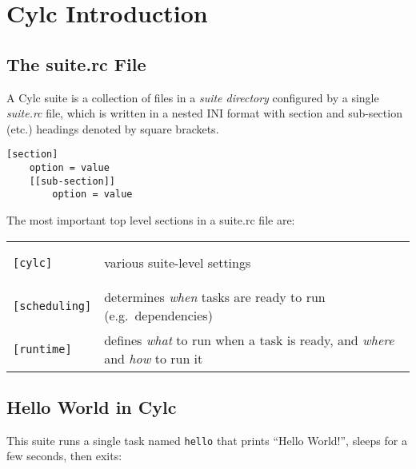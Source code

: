 \section{Cylc Introduction}
\label{Cylc Introduction}


\subsection{The suite.rc File}

A Cylc suite is a collection of files in a {\em suite directory} configured by
a single {\em suite.rc} file, which is written in a nested INI format with
section and sub-section (etc.) headings denoted by square brackets.

\begin{lstlisting}[language=suiterc]
[section]
    option = value
    [[sub-section]]
        option = value
\end{lstlisting}

The most important top level sections in a suite.rc file are:

\begin{tabular}{ll}
\begin{lstlisting}
[cylc]
\end{lstlisting} & various suite-level settings\\
\begin{lstlisting}
[scheduling]
\end{lstlisting} & determines {\em when} tasks are ready to run (e.g.\ dependencies)\\
\begin{lstlisting}
[runtime]
\end{lstlisting} & defines {\em what} to run when a task is ready, and
{\em where} and {\em how} to run it \\
\end{tabular}


\subsection{Hello World in Cylc}
\label{Hello World in Cylc}
This suite runs a single task named \lstinline{hello} that prints ``Hello
World!'', sleeps for a few seconds, then exits:


